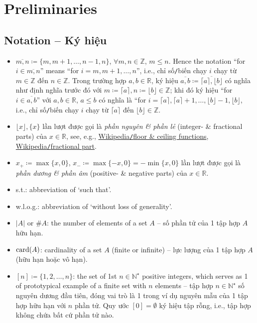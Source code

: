 \documentclass[oneside]{book}
\begin{document}

\section*{Preliminaries}


\subsection*{Notation -- Ký hiệu}

\begin{itemize}
	\item $\overline{m,n}\coloneqq\{m,m + 1,\ldots,n - 1, n\}$, $\forall m,n\in\mathbb{Z}$, $m\le n$. Hence the notation ``for $i\in\overline{m,n}$'' means ``for $i = m,m + 1,\ldots,n$'', i.e., chỉ số{\tt/}biến chạy $i$ chạy từ $m\in\mathbb{Z}$ đến $n\in\mathbb{Z}$. Trong trường hợp $a,b\in\mathbb{R}$, ký hiệu $\overline{a,b}\coloneqq\overline{\lceil a\rceil,\lfloor b\rfloor}$ có nghĩa như định nghĩa trước đó với $m\coloneqq\lceil a\rceil,n\coloneqq\lfloor b\rfloor\in\mathbb{Z}$; khi đó ký hiệu ``for $i\in\overline{a,b}$'' với $a,b\in\mathbb{R}$, $a\le b$ có nghĩa là ``for $i = \lceil a\rceil,\lceil a\rceil + 1,\ldots,\lfloor b\rfloor - 1,\lfloor b\rfloor$, i.e., chỉ số{\tt/}biến chạy $i$ chạy từ $\lceil a\rceil$ đến $\lfloor b\rfloor\in\mathbb{Z}$.
	\item $\lfloor x\rfloor,\{x\}$ lần lượt được gọi là {\it phần nguyên \& phần lẻ} (integer- \& fractional parts) của $x\in\mathbb{R}$, see, e.g., \href{https://en.wikipedia.org/wiki/Floor_and_ceiling_functions}{Wikipedia{\tt/}floor \& ceiling functions}, \href{https://en.wikipedia.org/wiki/Fractional_part}{Wikipedia{\tt/}fractional part}.
	\item $x_+\coloneqq\max\{x,0\}$, $x_-\coloneqq\max\{-x,0\} = -\min\{x,0\}$ lần lượt được gọi là {\it phần dương \& phần âm} (positive- \& negative parts) của $x\in\mathbb{R}$.
	\item s.t.: abbreviation of `such that'.
	\item w.l.o.g.: abbreviation of `without loss of generality'.
	\item $|A|$ or $\#A$: the number of elements of a set $A$ -- số phần tử của 1 tập hợp $A$ hữu hạn.
	\item ${\rm card}(A)$: cardinality of a set $A$ (finite or infinite) -- lực lượng của 1 tập hợp $A$ (hữu hạn hoặc vô hạn).
	\item $[n]\coloneqq\{1,2,\ldots,n\}$: the set of 1st $n\in\mathbb{N}^\star$ positive integers, which serves as 1 of prototypical example of a finite set with $n$ elements -- tập hợp $n\in\mathbb{N}^\star$ số nguyên dương  đầu tiên, đóng vai trò là 1 trong ví dụ nguyên mẫu của 1 tập hợp hữu hạn với $n$ phần tử. Quy ước $[0] = \emptyset$ ký hiệu tập rỗng, i.e., tập hợp không chứa bất cứ phần tử nào.
	

\end{itemize}
\end{document}
